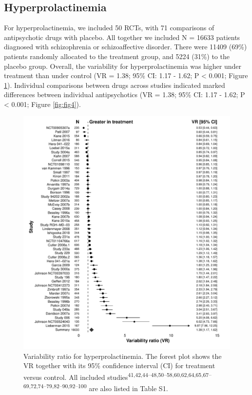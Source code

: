 \documentclass[9pt,english,,jou,floatsintext]{apa6}
\begin{document}
\subsection{Hyperprolactinemia}\label{hyperprolactinemia}

For hyperprolactinemia, we included 50 RCTs, with 71 comparisons of
antipsychotic drugs with placebo. All together we included N = 16633
patients diagnosed with schizophrenia or schizoaffective disorder. There
were 11409 (69\%) patients randomly allocated to the treatment group,
and 5224 (31\%) to the placebo group. Overall, the variability for
hyperprolactinemia was higher under treatment than under control (VR =
1.38; 95\% CI: 1.17 - 1.62; P \textless{} 0.001; Figure \ref{fig:fig3}).
Individual comparisons between drugs across studies indicated marked
differences between individual antipsychotics (VR = 1.38; 95\% CI: 1.17
- 1.62; P \textless{} 0.001; Figure \ref{fig:fig4}).

\begin{figure}
\centering
\includegraphics{../output/figures/prolactinsd_fig1.pdf}
\caption{\label{fig:fig3}Variability ratio for hyperprolactinemia. The
forest plot shows the VR together with its 95\% confidence interval (CI)
for treatment versus control. All included
studies\textsuperscript{41,42,44--48,50--58,60,62,64,65,67--69,72,74--79,82--90,92--100}
are also listed in Table S1.}
\end{figure}
\end{document}
